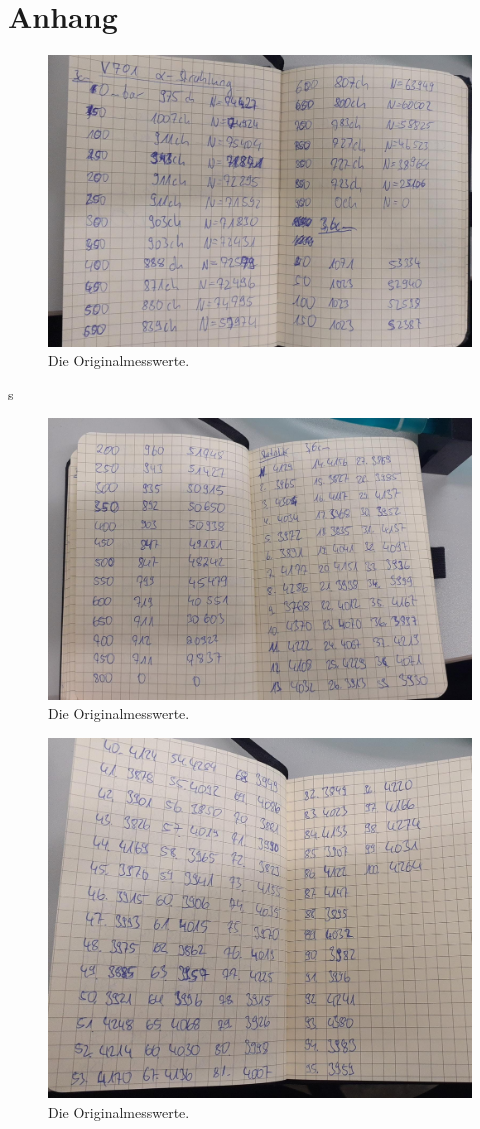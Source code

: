 \section*{Anhang}

\begin{figure}
  \centering
  \includegraphics{mess1.jpg}
  \caption{Die Originalmesswerte.}
  \label{fig:mess1}
\end{figure}s
\begin{figure}
  \centering
  \includegraphics{mess2.jpg}
  \caption{Die Originalmesswerte.}
  \label{fig:mess2}
\end{figure}
\begin{figure}
  \centering
  \includegraphics{mess3.jpg}
  \caption{Die Originalmesswerte.}
  \label{fig:mess3}
\end{figure}